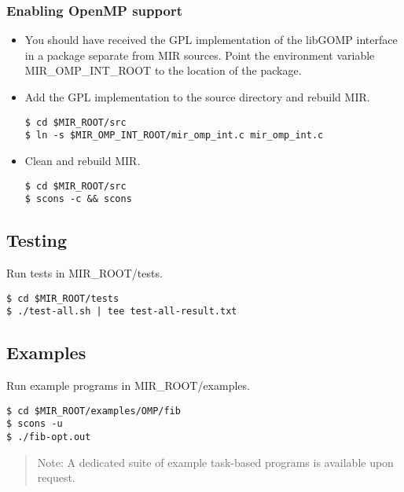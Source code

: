 \documentclass[11pt,a4paper]{article}
\begin{document}
\subsubsection{Enabling OpenMP support}\label{enable-omp-support}

\begin{itemize}
\item You should have received the GPL implementation of the libGOMP interface in a package separate from MIR sources. Point the environment variable MIR\_OMP\_INT\_ROOT to the location of the package.

\item Add the GPL implementation to the source directory and rebuild MIR.

\begin{lstlisting}[style=MyInputStyle]
$ cd $MIR_ROOT/src
$ ln -s $MIR_OMP_INT_ROOT/mir_omp_int.c mir_omp_int.c
\end{lstlisting}

\item Clean and rebuild MIR.

\begin{lstlisting}[style=MyInputStyle]
$ cd $MIR_ROOT/src
$ scons -c && scons
\end{lstlisting}
\end{itemize}

\subsection{Testing}\label{testing}

Run tests in MIR\_ROOT/tests.

\begin{lstlisting}[style=MyInputStyle]
$ cd $MIR_ROOT/tests
$ ./test-all.sh | tee test-all-result.txt
\end{lstlisting}

\subsection{Examples}\label{examples}

Run example programs in MIR\_ROOT/examples.

\begin{lstlisting}[style=MyInputStyle]
$ cd $MIR_ROOT/examples/OMP/fib
$ scons -u
$ ./fib-opt.out
\end{lstlisting}

\begin{framed}
\begin{quote}
Note: A dedicated suite of example task-based programs is available upon request.
\end{quote}
\end{framed}
\end{document}
